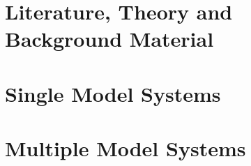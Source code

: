 \documentclass[11pt,fleqn]{report}
\theoremstyle{defstyle}
\begin{document}
\graphicspath{{./imgs/}{../imgs/}} %


\tableofcontents

\part{Literature, Theory and Background Material}




\part{Single Model Systems}



\part{Multiple Model Systems}






\newpage


\end{document}

